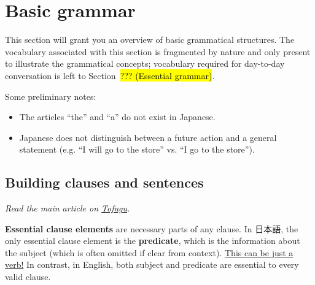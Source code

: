 \documentclass[../nihongo-gakushuu-kyouzai.tex]{subfiles}
\begin{document}
\onehalfspacing  %

\section{Basic grammar}
This section will grant you an overview of basic grammatical structures. The vocabulary associated with this section is fragmented by nature and only present to illustrate the grammatical concepts; vocabulary required for day-to-day conversation is left to Section~\hl{??? (Essential grammar)}.

Some preliminary notes:
\begin{itemize}
    \item The articles ``the'' and ``a'' do not exist in Japanese.
    \item Japanese does not distinguish between a future action and a general statement (e.g. ``I
    will go to the store'' vs. ``I go to the store'').
\end{itemize}

\subsection{Building clauses and sentences}
\emph{Read the main article on \href{https://www.tofugu.com/japanese-grammar/sentences-and-clauses/}{Tofugu}.}

\textbf{Essential clause elements} are necessary parts of any clause. In 日本語, the only essential clause element is the \textbf{predicate}, which is the information about the subject (which is often omitted if clear from context). \ul{This can be just a verb!} In contrast, in English, both subject and predicate are essential to every valid clause.
\end{document}

